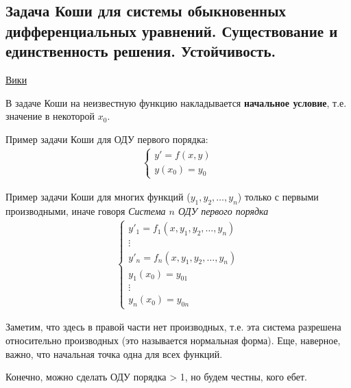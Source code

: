 \subsection{Задача Коши для системы обыкновенных дифференциальных уравнений. Существование и единственность решения. Устойчивость.}

\href{https://ru.wikipedia.org/wiki/%D0%97%D0%B0%D0%B4%D0%B0%D1%87%D0%B0_%D0%9A%D0%BE%D1%88%D0%B8}{Вики}


В задаче Коши на неизвестную функцию накладывается \textbf{начальное условие}, т.е. значение в некоторой $x_0$.

Пример задачи Коши для ОДУ первого порядка:
\begin{align*}
	\begin{cases}
		y' = f(x, y)\\
		y(x_0) = y_0 
	\end{cases}
\end{align*}

Пример задачи Коши для многих функций ($y_1, y_2, \ldots, y_n$) только с первыми производными, иначе говоря \textit{Система $n$ ОДУ первого порядка}
\begin{align*}
	\begin{cases}
		y'_1 = f_1(x, y_1, y_2, \ldots, y_n)\\
		\vdots\\
		y'_n = f_n(x, y_1, y_2, \ldots, y_n)\\
		y_1(x_0) = y_{01}\\
		\vdots\\
		y_n(x_0) = y_{0n}
	\end{cases}
\end{align*}

Заметим, что здесь в правой части нет производных, т.е. эта система разрешена относительно производных (это называется нормальная форма). Еще, наверное, важно, что начальная точка одна для всех функций.

Конечно, можно сделать ОДУ порядка > 1, но будем честны, кого ебет.

